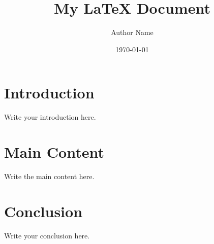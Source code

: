 \documentclass{article}
\title{My LaTeX Document}
\author{Author Name}
\date{\today}
\begin{document}
\maketitle

\section{Introduction}
Write your introduction here.

\section{Main Content}
Write the main content here.

\section{Conclusion}
Write your conclusion here.
\end{document}

